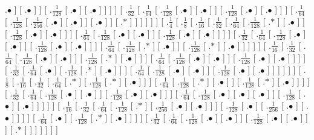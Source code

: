 \documentclass[a4paper,10pt]{article}
\begin{document}
\begin{landscape}
{.$\bullet$ ]  [ .$\bullet$ ]  ]  [ .$\frac{1}{128}$  [ .$\bullet$ ]  [ .$\bullet$ ]  ]  ]  ]  [ .$\frac{1}{32}$  [ .$\frac{1}{64}$  [ .$\frac{1}{128}$  [ .$\bullet$ ]  [ .$\bullet$ ]  ]  [ .$\frac{1}{128}$  [ .$\bullet$ ]  [ .$\bullet$ ]  ]  ]  [ .$\frac{1}{64}$  [ .$\frac{1}{128}$  [ .$\frac{1}{256}$  [ .$\bullet$ ]  [ .$\bullet$ ]  ]  [ .$\bullet$ ]  ]  [ .$*$ ]  ]  ]  ]  ]  ]  [ .$\frac{1}{4}$  [ .$\frac{1}{8}$  [ .$\frac{1}{16}$  [ .$\frac{1}{32}$  [ .$\frac{1}{64}$  [ .$\frac{1}{128}$  [ .$*$ ]  [ .$\bullet$ ]  ]  [ .$\frac{1}{128}$  [ .$\bullet$ ]  [ .$\bullet$ ]  ]  ]  [ .$\frac{1}{64}$  [ .$\frac{1}{128}$  [ .$\bullet$ ]  [ .$\bullet$ ]  ]  [ .$\frac{1}{128}$  [ .$\bullet$ ]  [ .$\bullet$ ]  ]  ]  ]  [ .$\frac{1}{32}$  [ .$\frac{1}{64}$  [ .$\frac{1}{128}$  [ .$\bullet$ ]  [ .$\bullet$ ]  ]  [ .$\frac{1}{128}$  [ .$\bullet$ ]  [ .$\bullet$ ]  ]  ]  [ .$\frac{1}{64}$  [ .$\frac{1}{128}$  [ .$*$ ]  [ .$\bullet$ ]  ]  [ .$\frac{1}{128}$  [ .$*$ ]  [ .$\bullet$ ]  ]  ]  ]  ]  [ .$\frac{1}{16}$  [ .$\frac{1}{32}$  [ .$\frac{1}{64}$  [ .$\frac{1}{128}$  [ .$\bullet$ ]  [ .$\bullet$ ]  ]  [ .$\frac{1}{128}$  [ .$*$ ]  [ .$\bullet$ ]  ]  ]  [ .$\frac{1}{64}$  [ .$\frac{1}{128}$  [ .$\bullet$ ]  [ .$\bullet$ ]  ]  [ .$\frac{1}{128}$  [ .$\bullet$ ]  [ .$\bullet$ ]  ]  ]  ]  [ .$\frac{1}{32}$  [ .$\frac{1}{64}$  [ .$\bullet$ ]  [ .$\frac{1}{128}$  [ .$*$ ]  [ .$\bullet$ ]  ]  ]  [ .$\frac{1}{64}$  [ .$\frac{1}{128}$  [ .$\bullet$ ]  [ .$\bullet$ ]  ]  [ .$\frac{1}{128}$  [ .$\bullet$ ]  [ .$\bullet$ ]  ]  ]  ]  ]  ]  [ .$\frac{1}{8}$  [ .$\frac{1}{16}$  [ .$\frac{1}{32}$  [ .$\frac{1}{64}$  [ .$*$ ]  [ .$\frac{1}{128}$  [ .$*$ ]  [ .$\bullet$ ]  ]  ]  [ .$\frac{1}{64}$  [ .$\frac{1}{128}$  [ .$*$ ]  [ .$\bullet$ ]  ]  [ .$\frac{1}{128}$  [ .$*$ ]  [ .$\bullet$ ]  ]  ]  ]  [ .$\frac{1}{32}$  [ .$\frac{1}{64}$  [ .$\frac{1}{128}$  [ .$\bullet$ ]  [ .$\bullet$ ]  ]  [ .$\frac{1}{128}$  [ .$\bullet$ ]  [ .$\bullet$ ]  ]  ]  [ .$\frac{1}{64}$  [ .$\frac{1}{128}$  [ .$\bullet$ ]  [ .$\bullet$ ]  [ .$\bullet$ ]  ]  [ .$\frac{1}{128}$  [ .$\bullet$ ]  [ .$\bullet$ ]  ]  ]  ]  ]  [ .$\frac{1}{16}$  [ .$\frac{1}{32}$  [ .$\frac{1}{64}$  [ .$\frac{1}{128}$  [ .$*$ ]  [ .$\frac{1}{256}$  [ .$\bullet$ ]  [ .$\bullet$ ]  ]  ]  [ .$\frac{1}{128}$  [ .$\bullet$ ]  [ .$\frac{1}{256}$  [ .$\bullet$ ]  [ .$\bullet$ ]  ]  ]  ]  [ .$\frac{1}{64}$  [ .$\bullet$ ]  [ .$\frac{1}{128}$  [ .$*$ ]  [ .$\bullet$ ]  ]  ]  ]  [ .$\frac{1}{32}$  [ .$\frac{1}{64}$  [ .$\frac{1}{128}$  [ .$\bullet$ ]  [ .$\bullet$ ]  ]  [ .$\frac{1}{128}$  [ .$\bullet$ ]  [ .$\bullet$ ]  ]  ]  [ .$*$ ]  ]  ]  ]  ]  ]  ] 
}

\end{landscape}
\end{document}
